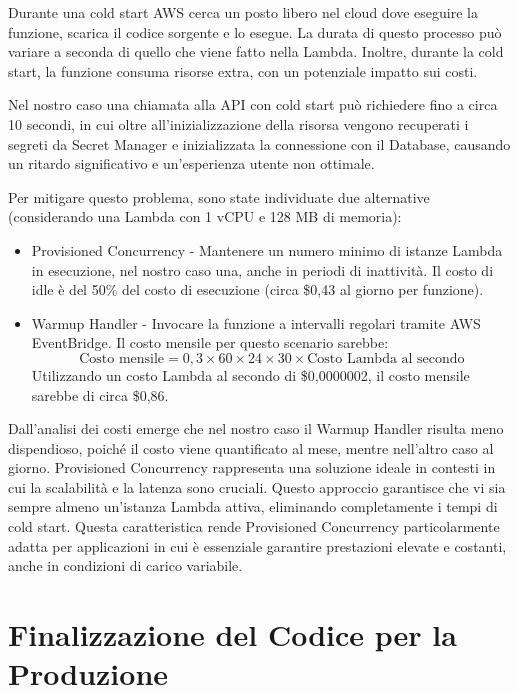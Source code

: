 Durante una cold start AWS cerca un posto libero nel cloud dove eseguire la funzione, scarica il codice sorgente e lo esegue. La durata di questo processo può variare a seconda di quello che viene fatto nella Lambda. Inoltre, durante la cold start, la funzione consuma risorse extra, con un potenziale impatto sui costi.

Nel nostro caso una chiamata alla API con cold start può richiedere fino a circa 10 secondi, in cui oltre all'inizializzazione della risorsa vengono recuperati i segreti da Secret Manager e inizializzata la connessione con il Database, causando un ritardo significativo e un'esperienza utente non ottimale. 

Per mitigare questo problema, sono state individuate due alternative (considerando una Lambda con 1 vCPU e 128 MB di memoria):
\begin{itemize}
    \item Provisioned Concurrency - Mantenere un numero minimo di istanze Lambda in esecuzione, nel nostro caso una, anche in periodi di inattività. Il costo di idle è del 50\% del costo di esecuzione (circa \$0,43 al giorno per funzione).
    
    \item Warmup Handler - Invocare la funzione a intervalli regolari tramite AWS EventBridge. Il costo mensile per questo scenario sarebbe:
    \[
    \text{Costo mensile} = 0,3 \times 60 \times 24 \times 30 \times \text{Costo Lambda al secondo}
    \]
    Utilizzando un costo Lambda al secondo di \$0,0000002, il costo mensile sarebbe di circa \$0,86.
\end{itemize}

Dall'analisi dei costi emerge che nel nostro caso il Warmup Handler risulta meno dispendioso, poiché il costo viene quantificato al mese, mentre nell'altro caso al giorno. 
Provisioned Concurrency rappresenta una soluzione ideale in contesti in cui la scalabilità e la latenza sono cruciali. Questo approccio garantisce che vi sia sempre almeno un'istanza Lambda attiva, eliminando completamente i tempi di cold start. Questa caratteristica rende Provisioned Concurrency particolarmente adatta per applicazioni in cui è essenziale garantire prestazioni elevate e costanti, anche in condizioni di carico variabile.

\section{Finalizzazione del Codice per la Produzione}

